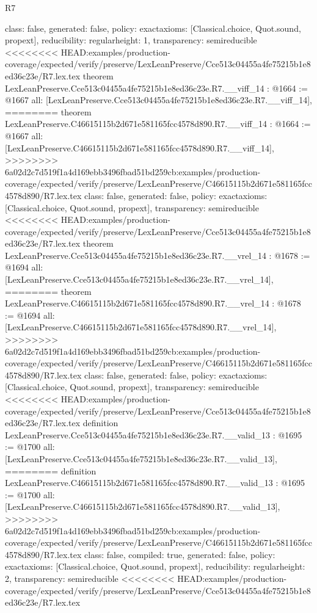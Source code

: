 \begin{lexlean}{R7}
\begin{coremodule}
{{{{{{{{  class: false,
  generated: false,
  policy: exact{axioms: [Classical.choice, Quot.sound, propext]},
  reducibility: regular{height: 1},
  transparency: semireducible
}
<<<<<<<< HEAD:examples/production-coverage/expected/verify/preserve/LexLeanPreserve/Cce513c04455a4fe75215b1e8ed36c23e/R7.lex.tex
theorem LexLeanPreserve.Cce513c04455a4fe75215b1e8ed36c23e.R7.__viff_14 : @1664 := @1667 {
  all: [LexLeanPreserve.Cce513c04455a4fe75215b1e8ed36c23e.R7.__viff_14],
========
theorem LexLeanPreserve.C46615115b2d671e581165fcc4578d890.R7.__viff_14 : @1664 := @1667 {
  all: [LexLeanPreserve.C46615115b2d671e581165fcc4578d890.R7.__viff_14],
>>>>>>>> 6a02d2c7d519f1a4d169ebb3496fbad51bd259cb:examples/production-coverage/expected/verify/preserve/LexLeanPreserve/C46615115b2d671e581165fcc4578d890/R7.lex.tex
  class: false,
  generated: false,
  policy: exact{axioms: [Classical.choice, Quot.sound, propext]},
  transparency: semireducible
}
<<<<<<<< HEAD:examples/production-coverage/expected/verify/preserve/LexLeanPreserve/Cce513c04455a4fe75215b1e8ed36c23e/R7.lex.tex
theorem LexLeanPreserve.Cce513c04455a4fe75215b1e8ed36c23e.R7.__vrel_14 : @1678 := @1694 {
  all: [LexLeanPreserve.Cce513c04455a4fe75215b1e8ed36c23e.R7.__vrel_14],
========
theorem LexLeanPreserve.C46615115b2d671e581165fcc4578d890.R7.__vrel_14 : @1678 := @1694 {
  all: [LexLeanPreserve.C46615115b2d671e581165fcc4578d890.R7.__vrel_14],
>>>>>>>> 6a02d2c7d519f1a4d169ebb3496fbad51bd259cb:examples/production-coverage/expected/verify/preserve/LexLeanPreserve/C46615115b2d671e581165fcc4578d890/R7.lex.tex
  class: false,
  generated: false,
  policy: exact{axioms: [Classical.choice, Quot.sound, propext]},
  transparency: semireducible
}
<<<<<<<< HEAD:examples/production-coverage/expected/verify/preserve/LexLeanPreserve/Cce513c04455a4fe75215b1e8ed36c23e/R7.lex.tex
definition LexLeanPreserve.Cce513c04455a4fe75215b1e8ed36c23e.R7.__valid_13 : @1695 := @1700 {
  all: [LexLeanPreserve.Cce513c04455a4fe75215b1e8ed36c23e.R7.__valid_13],
========
definition LexLeanPreserve.C46615115b2d671e581165fcc4578d890.R7.__valid_13 : @1695 := @1700 {
  all: [LexLeanPreserve.C46615115b2d671e581165fcc4578d890.R7.__valid_13],
>>>>>>>> 6a02d2c7d519f1a4d169ebb3496fbad51bd259cb:examples/production-coverage/expected/verify/preserve/LexLeanPreserve/C46615115b2d671e581165fcc4578d890/R7.lex.tex
  class: false,
  compiled: true,
  generated: false,
  policy: exact{axioms: [Classical.choice, Quot.sound, propext]},
  reducibility: regular{height: 2},
  transparency: semireducible
}
<<<<<<<< HEAD:examples/production-coverage/expected/verify/preserve/LexLeanPreserve/Cce513c04455a4fe75215b1e8ed36c23e/R7.lex.tex
}}}}}}}}}}
\end{coremodule}
\end{lexlean}
